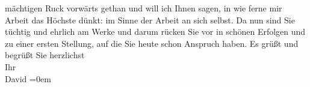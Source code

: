 \begin{ledgroupsized}[t]{13cm}
               mächtigen Ruck vorwärts gethan und will ich Ihnen sagen, in wie ferne mir Arbeit das
               Höchste dünkt: im Sinne der Arbeit an sich selbst. Da nun sind Sie tüchtig und
               ehrlich am Werke und darum rücken Sie vor in schönen Erfolgen und zu einer ersten
               Stellung, auf die Sie heute schon Anspruch haben.\pend
           \pstart
           Es grüßt und begrüßt Sie herzlichst{\\[\baselineskip]}Ihr{\\[\baselineskip]}\spacefill\mbox{David}\pend
           \leftskip=0em{}\endnumbering{}\end{ledgroupsized}  \newcommand{\dateiname}{L00411}\newcommand{\titel}{Jakob Julius David an Arthur Schnitzler, 23. 12. 1894}\newcommand{\editorInnen}{Martin Anton Müller und Gerd-Hermann Susen}
      